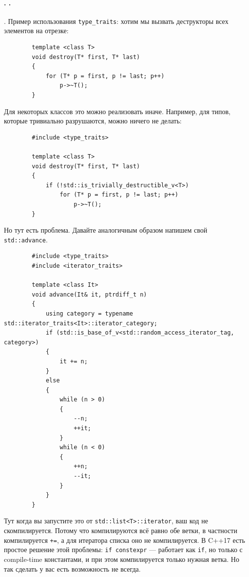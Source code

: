 \documentclass{article}
\begin{document}
    \paragraph{. .}.
    Пример использования \Verb|type_traits|: хотим мы вызвать деструкторы всех элементов на отрезке:
    \begin{verbatim}
        template <class T>
        void destroy(T* first, T* last)
        {
            for (T* p = first, p != last; p++)
                p->~T();
        }
    \end{verbatim}
    Для некоторых классов это можно реализовать иначе. Например, для типов, которые тривиально разрушаются, можно ничего не делать:
    \begin{verbatim}
        #include <type_traits>
        
        template <class T>
        void destroy(T* first, T* last)
        {
            if (!std::is_trivially_destructible_v<T>)
                for (T* p = first, p != last; p++)
                    p->~T();
        }
    \end{verbatim}
    Но тут есть проблема. Давайте аналогичным образом напишем свой \texttt{std::advance}.
    \begin{verbatim}
        #include <type_traits>
        #include <iterator_traits>

        template <class It>
        void advance(It& it, ptrdiff_t n)
        {
            using category = typename std::iterator_traits<It>::iterator_category;
            if (std::is_base_of_v<std::random_access_iterator_tag, category>)
            {
                it += n;
            }
            else
            {
                while (n > 0)
                {
                    --n;
                    ++it;
                }
                while (n < 0)
                {
                    ++n;
                    --it;
                }
            }
        }
    \end{verbatim}
    Тут когда вы запустите это от \texttt{std::list<T>::iterator}, ваш код не скомпилируется. Потому что компилируются всё равно обе ветки, в частности компилируется \texttt{+=}, а для итератора списка оно не компилируется. В C++17 есть простое решение этой проблемы: \texttt{if constexpr} --- работает как \texttt{if}, но только с compile-time константами, и при этом компилируется только нужная ветка. Но так сделать у вас есть возможность не всегда.
\end{document}

